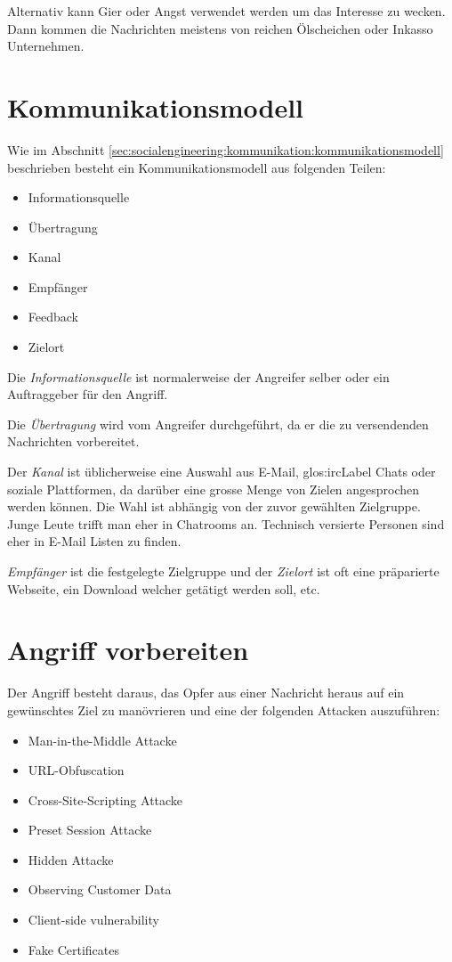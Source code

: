 Alternativ kann Gier oder Angst verwendet werden um das Interesse zu wecken. Dann kommen die Nachrichten meistens von reichen Ölscheichen oder Inkasso Unternehmen.

\section{Kommunikationsmodell}
Wie im Abschnitt \ref{sec:socialengineering:kommunikation:kommunikationsmodell} beschrieben besteht ein Kommunikationsmodell aus folgenden Teilen:
\begin{itemize}
\item Informationsquelle
\item Übertragung
\item Kanal
\item Empfänger
\item Feedback
\item Zielort
\end{itemize}

Die \textit{Informationsquelle} ist normalerweise der Angreifer selber oder ein Auftraggeber für den Angriff.

Die \textit{Übertragung} wird vom Angreifer durchgeführt, da er die zu versendenden Nachrichten vorbereitet.

Der \textit{Kanal} ist üblicherweise eine Auswahl aus E-Mail,  \Gls{glos:ircLabel} Chats oder soziale Plattformen, da darüber eine grosse Menge von Zielen angesprochen werden können. Die Wahl ist abhängig von der zuvor gewählten Zielgruppe. Junge Leute trifft man eher in Chatrooms an. Technisch versierte Personen sind eher in E-Mail Listen zu finden.

\textit{Empfänger} ist die festgelegte Zielgruppe und der \textit{Zielort} ist oft eine präparierte Webseite, ein Download welcher getätigt werden soll, etc.

\section{Angriff vorbereiten}
Der Angriff besteht daraus, das Opfer aus einer Nachricht heraus auf ein gewünschtes Ziel zu manövrieren und eine der folgenden Attacken auszuführen:
\begin{itemize}
\item Man-in-the-Middle Attacke
\item URL-Obfuscation
\item Cross-Site-Scripting Attacke
\item Preset Session Attacke
\item Hidden Attacke
\item Observing Customer Data
\item Client-side vulnerability
\item Fake Certificates
\end{itemize}

